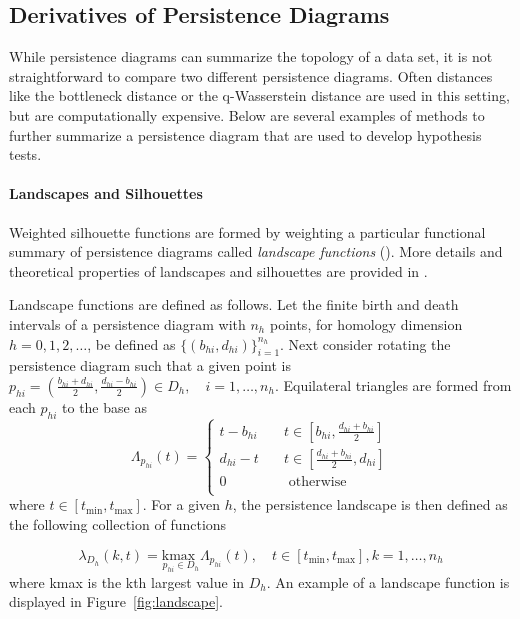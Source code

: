 \documentclass[12pt]{article}
\begin{document}
\subsection{Derivatives of Persistence Diagrams}
While persistence diagrams can summarize the topology of a data set, it is not straightforward to compare two different persistence diagrams. Often distances like the bottleneck distance or the q-Wasserstein distance are used in this setting, but are computationally expensive. Below are several examples of methods to further summarize a persistence diagram that are used to develop hypothesis tests.

\paragraph{Landscapes and Silhouettes}
Weighted silhouette functions are formed by weighting a particular functional summary of persistence diagrams called \emph{landscape functions} (\cite{bubenik2015statistical}). More details and theoretical properties of landscapes and silhouettes are provided in \cite{chazal2014stochastic}.

Landscape functions are defined as follows.  Let the finite birth and death intervals of a persistence diagram with $n_h$ points, for homology dimension $h = 0, 1, 2, \ldots$, be defined as $\{(b_{hi},d_{hi})\}_{i = 1}^{n_h}$.  Next consider rotating the persistence diagram such that a given point is $p_{hi} = \left(\frac{b_{hi}+d_{hi}}{2}, \frac{d_{hi}-b_{hi}}{2}\right) \in D_h, \quad i = 1, \ldots, n_h$.  Equilateral triangles are formed from each $p_{hi}$ to the base as
\begin{equation*}
\Lambda_{p_{hi}}(t) =
  \begin{cases}
    t - b_{hi}  & \quad t \in [b_{hi}, \frac{d_{hi}+b_{hi}}{2}]\\
    d_{hi} - t  & \quad t \in [\frac{d_{hi}+b_{hi}}{2}, d_{hi}]\\
    0  & \quad \text{ otherwise}\\
  \end{cases}
\end{equation*}
where $t \in [t_{\min}, t_{\max}]$. For a given $h$, the persistence landscape is then defined as the following collection of functions

\begin{equation*}
\lambda_{D_h}(k, t) = \underset{p_{hi}\in D_h}{\text{kmax }} \Lambda_{p_{hi}}(t), \quad t \in [t_{\min}, t_{\max}], k = 1, \ldots, n_h
\end{equation*}
where kmax is the kth largest value in $D_h$.  An example of a landscape function is displayed in Figure~\ref{fig:landscape}.
\end{document}
